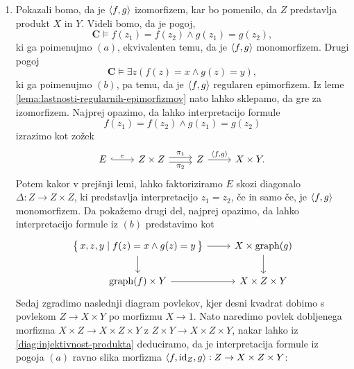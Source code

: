 \documentclass[../kategoricna_logika.tex]{subfiles}
\begin{document}
\begin{dokaz}
\begin{enumerate}[label=(\roman*)]
    \item Pokazali bomo, da je $\langle f,g \rangle$ izomorfizem, kar bo pomenilo,
      da $Z$ predstavlja produkt $X$ in $Y$. Videli bomo, da je pogoj,
      \[ \mathbf{C} \models f(z_{1}) = f(z_{2}) \land g(z_{1}) = g(z_{2}), \]
      ki ga poimenujmo \((a)\), ekvivalenten temu, da je \( \langle f,g \rangle\) monomorfizem.
      Drugi pogoj
      \[ \mathbf{C} \models \exists z(f(z) = x \land g(z) = y), \]
      ki ga poimenujmo \((b)\), pa temu, da je \( \langle f,g \rangle\) regularen epimorfizem.
      Iz leme \ref{lema:lastnosti-regularnih-epimorfizmov} nato lahko sklepamo,
      da gre za izomorfizem.
      Najprej opazimo, da lahko interpretacijo formule
      \[ f(z_{1}) = f(z_{2}) \land g(z_{1}) = g(z_{2})\]
      izrazimo kot zožek
      \begin{equation*}
        \begin{tikzcd}
          E \ar[r, hook, "e"] & Z \times Z
          \ar[r, shift left, "\pi_{1}"] \ar[r, shift right, "\pi_{2}"'] & Z
          \ar[r, , "\fprod{f, g}"] & X \times Y.
        \end{tikzcd}
      \end{equation*}
      Potem kakor v prejšnji lemi, lahko faktoriziramo $E$ skozi diagonalo
      $\Delta : Z \to Z \times Z$,
      ki predstavlja interpretacijo $z_{1} = z_{2}$, če in samo če, je $\langle f, g \rangle$ monomorfizem.
      Da pokažemo drugi del, najprej opazimo, da lahko interpretacijo formule iz $(b)$
      predstavimo kot
      \begin{equation}\label{diag:injektivnost-produkta}
        \begin{tikzcd}
          \set{x,z,y \mid f(z) = x \land g(z) = y} \ar[d] \ar[r] &
          X \times \mathrm{graph}(g) \ar[d] \\
          \mathrm{graph}(f) \times Y \ar[r] & X \times Z \times Y
        \end{tikzcd}
      \end{equation}
      Sedaj zgradimo naslednji diagram povlekov, kjer desni kvadrat dobimo s povlekom
      $Z \to X \times Y$ po morfizmu $X \to 1$. Nato naredimo povlek dobljenega morfizma
      $X \times Z \to X \times Z \times Y$ z $Z \times Y \to X \times Z \times Y$,
      nakar lahko iz \ref{diag:injektivnost-produkta} deduciramo, da je interpretacija
      formule iz pogoja $(a)$ ravno slika morfizma
      $\langle f, \mathrm{id}_{Z}, g \rangle : Z \to X \times Z \times Y$:
      \begin{equation*}
        \begin{tikzcd}[column sep=small]

\end{tikzcd}
\end{equation*}
\end{enumerate}
\end{dokaz}
\end{document}
